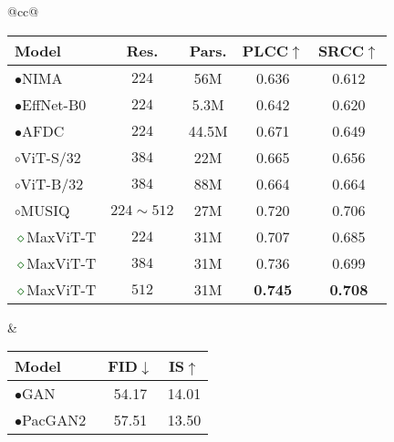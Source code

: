 \documentclass[runningheads]{llncs}
\begin{document}
\begin{table*}[!t]
\centering
\setlength{\tabcolsep}{3pt}
\begin{tabular}{@{}cc@{}}
\begin{minipage}[t]{0.57\textwidth}
\setlength{\tabcolsep}{1.6pt}
\renewcommand{\arraystretch}{1.0}
\caption{\textbf{Image aesthetic assessment results on the AVA benchmark~\cite{murray2012ava}}. PLCC and SRCC represent the Pearson's linear and Spearman's rank correlation coefficients.}
\label{tab:iqa-comparison}
\begin{tabular}{l|cccc}
Model & Res. & Pars. & PLCC$\uparrow$& SRCC$\uparrow$ \\
\toprule
\textcolor{blueish}{$\bullet$}NIMA~\cite{talebi2018nima} & $224$ & 56M & 0.636 & 0.612 \\
\textcolor{blueish}{$\bullet$}EffNet-B0~\cite{tan2019efficientnet} & $224$ & 5.3M & 0.642 & 0.620 \\
\textcolor{blueish}{$\bullet$}AFDC\cite{chen2020adaptive} & $224$ & 44.5M & 0.671 & 0.649 \\\hline
\textcolor{brickred}{$\circ$}ViT-S/32~\cite{ke2021musiq} & $384$ & 22M & 0.665 & 0.656 \\
\textcolor{brickred}{$\circ$}ViT-B/32~\cite{ke2021musiq} & $384$ & 88M & 0.664 & 0.664 \\
\textcolor{brickred}{$\circ$}MUSIQ~\cite{ke2021musiq} & \footnotesize{$224\!\sim\!512$} & 27M & 0.720 & 0.706 \\\hline
\textcolor{darkgreen}{$\diamond$}MaxViT-T & $224$ & 31M & 0.707 & 0.685 \\
\textcolor{darkgreen}{$\diamond$}MaxViT-T & $384$ & 31M & 0.736 & 0.699 \\
\textcolor{darkgreen}{$\diamond$}MaxViT-T & $512$ & 31M & \textbf{0.745} & \textbf{0.708} \\
\end{tabular}
\end{minipage}&
\begin{minipage}[t]{0.4\textwidth}
\setlength{\tabcolsep}{2.5pt}
\renewcommand{\arraystretch}{1.}
\caption{\textbf{Comparison of image generation on ImageNet}. $\ddagger$ used a pre-trained ImageNet classifier.}
\label{tab:generation-comparison}
\begin{tabular}{l|cc}
Model  & FID$\downarrow$& IS$\uparrow$ \\
\toprule
\textcolor{blueish}{$\bullet$}GAN~\cite{goodfellow2014generative}  & 54.17 & 14.01 \\
\textcolor{blueish}{$\bullet$}PacGAN2~\cite{lin2018pacgan}  & 57.51 & 13.50 \\

\end{tabular}
\end{minipage}
\end{tabular}
\end{table*}
\end{document}
